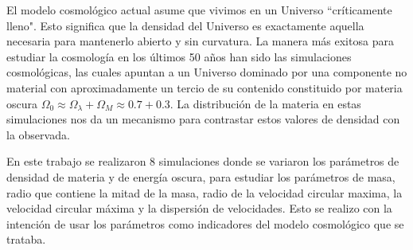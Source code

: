 
El modelo cosmológico actual asume que vivimos en un Universo ``críticamente lleno". Esto significa que la densidad  del Universo es exactamente aquella necesaria para mantenerlo abierto y sin curvatura. La manera más exitosa para estudiar la cosmología en los últimos 50 años han sido las simulaciones cosmológicas, las cuales apuntan a un Universo dominado por una componente no material con aproximadamente un tercio de su contenido constituido por materia oscura $\Omega_0 \approx \Omega_\lambda + \Omega_M \approx 0.7+ 0.3$. La distribución de la materia en estas simulaciones nos da un mecanismo para contrastar estos valores de densidad con la observada.


 En este trabajo se realizaron 8 simulaciones donde se variaron los parámetros de densidad de materia y de energía oscura, para estudiar los parámetros de masa, radio que contiene la mitad de la masa, radio de la velocidad circular maxima, la velocidad circular máxima y la dispersión de velocidades. Esto se realizo con la intención de usar los parámetros como indicadores del modelo cosmológico que se trataba.



